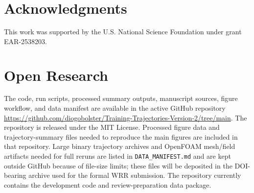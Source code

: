 \documentclass[11pt]{article}
\begin{document}
\section*{Acknowledgments}

This work was supported by the U.S. National Science Foundation under grant EAR-2538203.

\section*{Open Research}

The code, run scripts, processed summary outputs, manuscript sources, figure workflow, and data manifest are available in the active GitHub repository \url{https://github.com/diogobolster/Training-Trajectories-Version-2/tree/main}. The repository is released under the MIT License. Processed figure data and trajectory-summary files needed to reproduce the main figures are included in that repository. Large binary trajectory archives and OpenFOAM mesh/field artifacts needed for full reruns are listed in \texttt{DATA\_MANIFEST.md} and are kept outside GitHub because of file-size limits; these files will be deposited in the DOI-bearing archive used for the formal WRR submission. The repository currently contains the development code and review-preparation data package.



\end{document}
